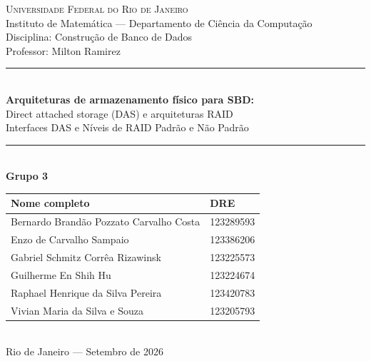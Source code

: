 \documentclass[11pt,a4paper]{article}
\begin{document}
\thispagestyle{empty}
\begin{center}
{\large\scshape Universidade Federal do Rio de Janeiro}\\[2pt]
{\normalsize Instituto de Matemática --- Departamento de Ciência da Computação}\\[2pt]
{\normalsize Disciplina: Construção de Banco de Dados}\\[2pt]
{\normalsize Professor: Milton Ramirez}\\[17mm]
{\color{azul}\rule{\textwidth}{1.2pt}}\\[6mm]
{\LARGE\bfseries Arquiteturas de armazenamento físico para SBD:}\\[4mm]
{\Large Direct attached storage (DAS) e arquiteturas RAID}\\[4mm]
{\large Interfaces DAS e Níveis de RAID Padrão e Não Padrão}\\[6mm]
{\color{azul}\rule{\textwidth}{1.2pt}}\\[8mm]
{\large\bfseries Grupo 3}\\[6mm]
\begin{tabular}{@{}ll@{}}\toprule
\textbf{Nome completo} & \textbf{DRE}\\\midrule
Bernardo Brandão Pozzato Carvalho Costa & 123289593\\
Enzo de Carvalho Sampaio & 123386206\\
Gabriel Schmitz Corrêa Rizawinsk & 123225573\\
Guilherme En Shih Hu & 123224674\\
Raphael Henrique da Silva Pereira & 123420783\\
Vivian Maria da Silva e Souza & 123205793\\\bottomrule
\end{tabular}\\[12mm]
{\normalsize Rio de Janeiro --- Setembro de 2026}
\end{center}
\clearpage

\tableofcontents
\clearpage
\end{document}
